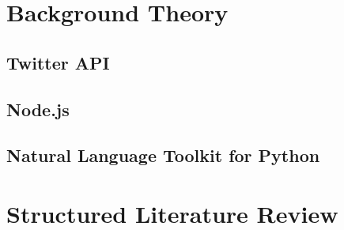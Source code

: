 \section{Background Theory}
	
	\subsection{Twitter API}
	
	
	\subsection{Node.js}
		
	
	\subsection{Natural Language Toolkit for Python}

\section{Structured Literature Review}
